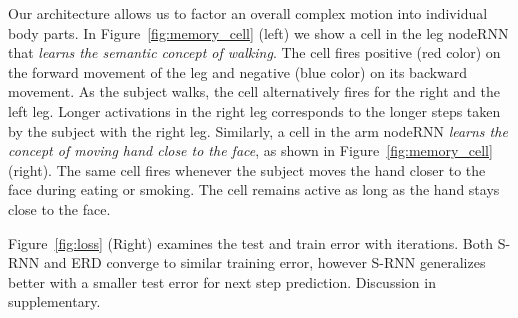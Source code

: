 \documentclass[10pt,twocolumn,letterpaper]{article}
\begin{document}
\iffalse
 Our architecture allows us to factor an overall complex motion into individual body parts. In Figure~\ref{fig:memory_cell} (left) we show a cell in the leg nodeRNN that \textit{learns the semantic concept of walking}. The cell fires positive (red color) on the forward movement of the leg and negative (blue color) on its backward movement. As the subject walks, the cell alternatively fires for the right and the left leg. Longer activations in the right leg corresponds to the longer steps taken by the subject with the right leg. Similarly, a cell in the arm nodeRNN \textit{learns the concept of moving hand close to the face}, as shown in Figure~\ref{fig:memory_cell} (right). The same cell fires whenever the subject moves the hand closer to the face during eating or smoking. The cell remains active  as long as the hand stays close to the face. %

Figure~\ref{fig:loss} (Right) examines the test and train error with iterations. Both S-RNN and ERD converge to similar training error, however S-RNN generalizes better with a smaller test error for next step prediction. Discussion in supplementary.
\end{document}
